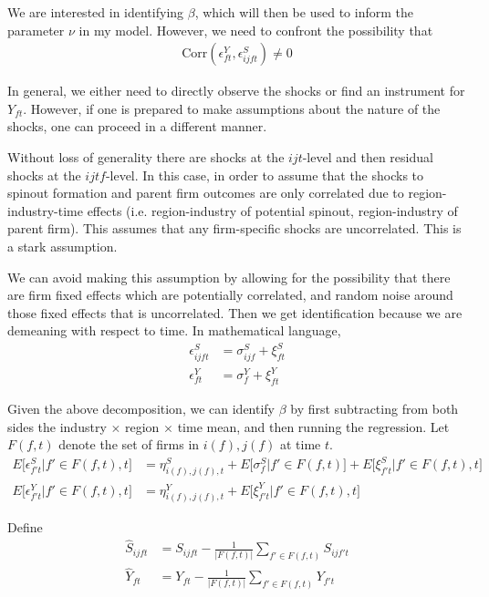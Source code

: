 \documentclass[12pt,english]{article}
\theoremstyle{remark}
\begin{document}
We are interested in identifying $\beta$, which will then be used to inform the parameter $\nu$ in my model. However, we need to confront the possibility that
\begin{align*}
	\mathrm{Corr}(\epsilon_{ft}^Y,\epsilon_{ijft}^S) \ne 0 
\end{align*}

In general, we either need to directly observe the shocks or find an instrument for $Y_{ft}$. However, if one is prepared to make assumptions about the nature of the shocks, one can proceed in a different manner. 

Without loss of generality there are shocks at the $ijt$-level and then residual shocks at the $ijtf$-level. In this case, in order to assume that the shocks to spinout formation and parent firm outcomes are only correlated due to region-industry-time effects (i.e. region-industry of potential spinout, region-industry of parent firm). This assumes that any firm-specific shocks are uncorrelated. This is a stark assumption.

We can avoid making this assumption by allowing for the possibility that there are firm fixed effects which are potentially correlated, and random noise around those fixed effects that is uncorrelated. Then we get identification because we are demeaning with respect to time. In mathematical language,
\begin{align*}
	\epsilon_{ijft}^S &= \sigma^S_{ijf} + \xi^S_{ft} \\
	\epsilon_{ft}^Y &= \sigma^Y_f  + \xi^Y_{ft}
\end{align*}

Given the above decomposition, we can identify $\beta$ by first subtracting from both sides the industry $\times$ region $\times$ time mean, and then running the regression. Let $F(f,t)$ denote the set of firms in $i(f),j(f)$ at time $t$. 
\begin{align}
	E \Big[ \epsilon^S_{f't} \big| f' \in F(f,t),t\Big] &= \eta^S_{i(f),j(f),t} + E\Big[\sigma_f^S \big| f' \in F(f,t)\Big] +  E\Big[\xi^S_{f't} \big| f'\in F(f,t),t\Big] \\
	E \Big[ \epsilon^Y_{f't} \Big| f' \in F(f,t),t \Big] &= \eta^Y_{i(f),j(f),t} + E\Big[\xi^Y_{f't} \big|f' \in F(f,t), t \Big]
\end{align}

Define
\begin{align*}
	\hat{S}_{ijft} &= S_{ijft} - \frac{1}{|F(f,t)|}\sum_{f'\in F(f,t)} S_{ijf't} \\
	\hat{Y}_{ft} &= Y_{ft} - \frac{1}{|F(f,t)|}\sum_{f'\in F(f,t)} Y_{f't}
\end{align*}
\end{document}
